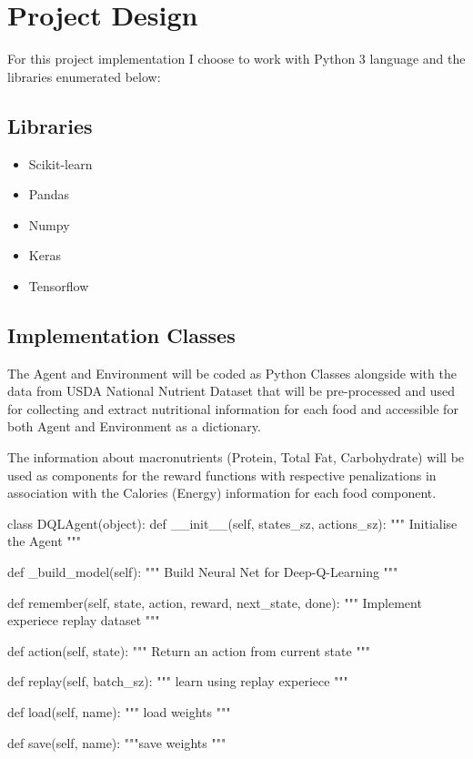 \documentclass{article}
\begin{document}
\section{Project Design}

For this project implementation I choose to work with Python 3 language and the libraries enumerated below:

\subsection{Libraries}

\begin{itemize}
    \item Scikit-learn
    \item Pandas
    \item Numpy
    \item Keras
    \item Tensorflow
\end{itemize}

\subsection{Implementation Classes}

The Agent and Environment will be coded as Python Classes alongside with the data from 
USDA National Nutrient Dataset that will be pre-processed and used for collecting and 
extract nutritional information for each food and accessible for both Agent and 
Environment as a dictionary. 

The information about macronutrients (Protein, Total Fat, Carbohydrate) will be 
used as components for the reward functions with respective penalizations in 
association with the Calories (Energy) information for each food component.


\begin{python}
class DQLAgent(object):
    def __init__(self, states_sz, actions_sz):
        """ Initialise the Agent """

    def _build_model(self):
        """ Build Neural Net for Deep-Q-Learning """

    def remember(self, state, action, reward, next_state, done):
        """ Implement experiece replay dataset """

    def action(self, state):
        """ Return an action from current state """

    def replay(self, batch_sz):
        """ learn using replay experiece """

    def load(self, name):
        """ load weights """

    def save(self, name):
        """save weights """

\end{python}
\end{document}
